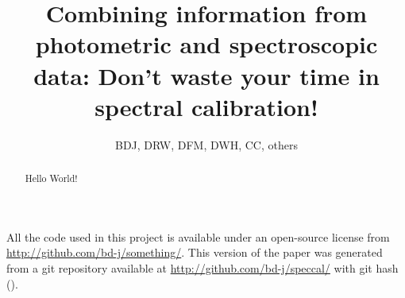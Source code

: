 \documentclass[iop,numberedappendix]{emulateapj}
\begin{document}
\title{Combining information from photometric and spectroscopic data:
  Don't waste your time in spectral calibration!}
\author{BDJ, DRW, DFM, DWH, CC, others}

\begin{abstract}
Hello World!
\end{abstract}


All the code used in this project is available under an open-source license
  from \url{http://github.com/bd-j/something/}.
This version of the paper was generated
  from a git repository available at \url{http://github.com/bd-j/speccal/}
  with git hash \texttt{\githash} (\gitdate).
\end{document}
